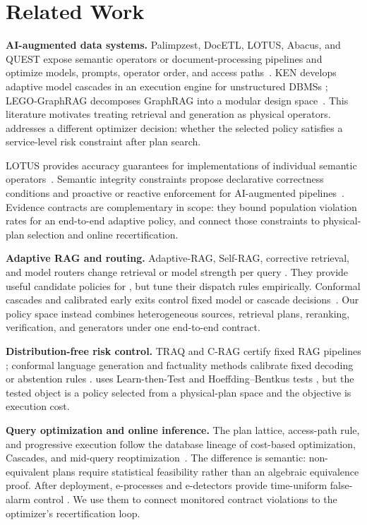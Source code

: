 \section{Related Work}
\label{sec:related}

\textbf{AI-augmented data systems.}
Palimpzest, DocETL, LOTUS, Abacus, and QUEST expose semantic operators or
document-processing pipelines and optimize models, prompts, operator
order, and access paths~\cite{liu2025palimpzest,shankar2024docetl,
patel2024lotus,russo2025abacus,chai2025quest}. KEN develops adaptive model
cascades in an execution engine for unstructured DBMSs
\cite{kossmann2026ken}; LEGO-GraphRAG decomposes GraphRAG into a modular
design space~\cite{cao2025lego}. This literature motivates treating
retrieval and generation as physical operators. \system addresses a
different optimizer decision: whether the selected policy satisfies a
service-level risk constraint after plan search.

LOTUS provides accuracy guarantees for implementations of individual
semantic operators~\cite{patel2024lotus}. Semantic integrity constraints
propose declarative correctness conditions and proactive or reactive
enforcement for AI-augmented pipelines~\cite{lee2025sic}. Evidence
contracts are complementary in scope: they bound population violation
rates for an end-to-end adaptive policy, and connect those constraints to
physical-plan selection and online recertification.

\textbf{Adaptive RAG and routing.}
Adaptive-RAG, Self-RAG, corrective retrieval, and model routers change
retrieval or model strength per query
\cite{jeong2024adaptiverag,asai2024selfrag,yan2024corrective,
chen2023frugalgpt,ong2024routellm,ding2024hybridllm}. They provide useful
candidate policies for \system, but tune their dispatch rules empirically.
Conformal cascades and calibrated early exits control fixed model or
cascade decisions~\cite{fisch2021admission,schuster2022calm}. Our policy
space instead combines heterogeneous sources, retrieval plans, reranking,
verification, and generators under one end-to-end contract.

\textbf{Distribution-free risk control.}
TRAQ and C-RAG certify fixed RAG pipelines
\cite{li2024traq,kang2024crag}; conformal language generation and
factuality methods calibrate fixed decoding or abstention rules
\cite{quach2024conformallm,mohri2024factuality}. \system uses
Learn-then-Test and Hoeffding--Bentkus tests
\cite{angelopoulos2021ltt,bentkus2004hoeffding}, but the tested object is a
policy selected from a physical-plan space and the objective is execution
cost.

\textbf{Query optimization and online inference.}
The plan lattice, access-path rule, and progressive execution follow the
database lineage of cost-based optimization, Cascades, and mid-query
reoptimization~\cite{selinger1979access,graefe1995cascades,
kabra1998efficient,markl2004robust}. The difference is semantic:
non-equivalent plans require statistical feasibility rather than an
algebraic equivalence proof. After deployment, e-processes and e-detectors
provide time-uniform false-alarm control
\cite{ramdas2023savi,shin2024edetectors}. We use them to connect monitored
contract violations to the optimizer's recertification loop.
